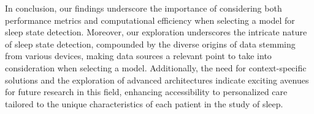 \documentclass{article}
\begin{document}
In conclusion, our findings underscore the importance of considering both performance metrics and computational efficiency when selecting a model for sleep state detection. Moreover, our exploration underscores the intricate nature of sleep state detection, compounded by the diverse origins of data stemming from various devices, making data sources a relevant point to take into consideration when selecting a model. Additionally, the need for context-specific solutions and the exploration of advanced architectures indicate exciting avenues for future research in this field, enhancing accessibility to personalized care tailored to the unique characteristics of each patient in the study of sleep.


{
\small
}
\end{document}
